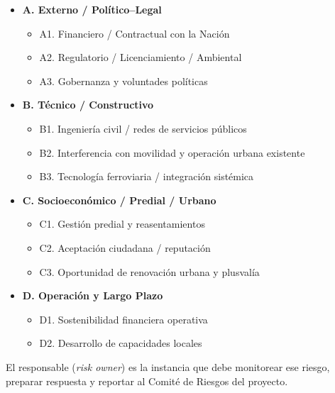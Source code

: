 \begin{itemize}
  \item \textbf{A. Externo / Político--Legal}
    \begin{itemize}
      \item A1. Financiero / Contractual con la Nación
      \item A2. Regulatorio / Licenciamiento / Ambiental
      \item A3. Gobernanza y voluntades políticas
    \end{itemize}
  \item \textbf{B. Técnico / Constructivo}
    \begin{itemize}
      \item B1. Ingeniería civil / redes de servicios públicos
      \item B2. Interferencia con movilidad y operación urbana existente
      \item B3. Tecnología ferroviaria / integración sistémica
    \end{itemize}
  \item \textbf{C. Socioeconómico / Predial / Urbano}
    \begin{itemize}
      \item C1. Gestión predial y reasentamientos
      \item C2. Aceptación ciudadana / reputación
      \item C3. Oportunidad de renovación urbana y plusvalía
    \end{itemize}
  \item \textbf{D. Operación y Largo Plazo}
    \begin{itemize}
      \item D1. Sostenibilidad financiera operativa
      \item D2. Desarrollo de capacidades locales
    \end{itemize}
\end{itemize}

El responsable (\textit{risk owner}) es la instancia que debe monitorear ese riesgo, preparar respuesta y reportar al Comité de Riesgos del proyecto.

